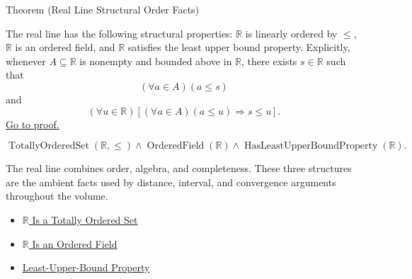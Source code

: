 \begin{theorembox}{Theorem (Real Line Structural Order Facts)}
\begin{theorem}\label{thm:real-line-structural-order-facts}
The real line has the following structural properties: $\mathbb{R}$ is
linearly ordered by $\leq$, $\mathbb{R}$ is an ordered field, and
$\mathbb{R}$ satisfies the least upper bound property.  Explicitly, whenever
$A\subseteq\mathbb{R}$ is nonempty and bounded above in $\mathbb{R}$, there
exists $s\in\mathbb{R}$ such that
\[
  (\forall a\in A)(a\leq s)
\]
and
\[
  (\forall u\in\mathbb{R})
  \left[
  (\forall a\in A)(a\leq u)
  \Longrightarrow
  s\leq u
  \right].
\]
\hyperref[prf:real-line-structural-order-facts]{Go to proof.}
\end{theorem}
\end{theorembox}

\begin{remark*}
\[
\operatorname{TotallyOrderedSet}(\mathbb{R},\leq)
\land
\operatorname{OrderedField}(\mathbb{R})
\land
\operatorname{HasLeastUpperBoundProperty}(\mathbb{R}).
\]
\end{remark*}

\begin{remark*}[Interpretation]
The real line combines order, algebra, and completeness. These three
structures are the ambient facts used by distance, interval, and convergence
arguments throughout the volume.
\end{remark*}

\begin{dependencies}
\begin{itemize}
  \item \hyperref[thm:r-totally-ordered-set]{$\mathbb{R}$ Is a Totally Ordered Set}
  \item \hyperref[thm:r-is-an-ordered-field]{$\mathbb{R}$ Is an Ordered Field}
  \item \hyperref[thm:lub-property-r]{Least-Upper-Bound Property}
\end{itemize}
\end{dependencies}
